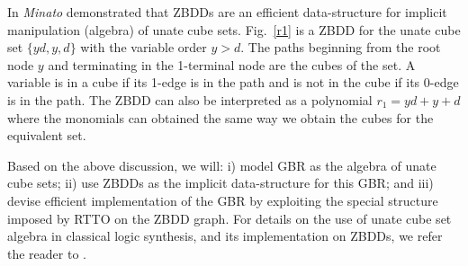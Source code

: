 In \cite{zbdd_unate} {\it Minato} demonstrated that ZBDDs are an efficient
data-structure for implicit manipulation (algebra) of unate cube
sets. Fig.~\ref{r1} is a ZBDD for the unate cube set $\{yd,y,d\}$ with the variable order 
$y > d$. The paths beginning from the root node $y$ and terminating in the 1-terminal node 
are the cubes of the set. A variable is in a cube if its 1-edge is in the path and is not 
in the cube if its 0-edge is in the path. The ZBDD can also be interpreted as a polynomial $r_1 = yd + y +d$ where 
the monomials can obtained the same way we obtain the cubes for the equivalent set. 

Based on the above discussion, we will: i) model GBR as the
algebra of unate cube sets; ii) use ZBDDs as the implicit
data-structure for this GBR; and iii) devise efficient implementation
of the GBR by exploiting the special structure imposed by RTTO on the
ZBDD graph.  For details on the use of unate cube set algebra in classical logic
synthesis, and its implementation on ZBDDs, we refer the reader to
\cite{zbdd} \cite{zbdd_unate}. 

